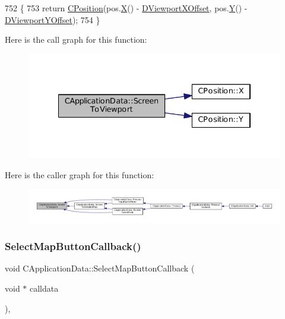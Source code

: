 \begin{DoxyCode}
752                                                                 \{
753     \textcolor{keywordflow}{return} \hyperlink{classCPosition}{CPosition}(pos.\hyperlink{classCPosition_a9a6b94d3b91df1492d166d9964c865fc}{X}() - \hyperlink{classCApplicationData_a306bba873ccc47126111305fe21ef3ff}{DViewportXOffset}, pos.\hyperlink{classCPosition_a1aa8a30e2f08dda1f797736ba8c13a87}{Y}() - 
      \hyperlink{classCApplicationData_afc58ed96a1af813b28f6abf2c7d2dc72}{DViewportYOffset});
754 \}
\end{DoxyCode}
Here is the call graph for this function\+:\nopagebreak
\begin{figure}[H]
\begin{center}
\leavevmode
\includegraphics[width=334pt]{classCApplicationData_aebd3ae4cfd74962413024f1649233f08_cgraph}
\end{center}
\end{figure}
Here is the caller graph for this function\+:\nopagebreak
\begin{figure}[H]
\begin{center}
\leavevmode
\includegraphics[width=350pt]{classCApplicationData_aebd3ae4cfd74962413024f1649233f08_icgraph}
\end{center}
\end{figure}
\hypertarget{classCApplicationData_a5f915dc03205b67ca79f4dcfd7b43f5a}{}\label{classCApplicationData_a5f915dc03205b67ca79f4dcfd7b43f5a} 
\subsubsection{\texorpdfstring{Select\+Map\+Button\+Callback()}{SelectMapButtonCallback()}}
{\footnotesize\ttfamily void C\+Application\+Data\+::\+Select\+Map\+Button\+Callback (\begin{DoxyParamCaption}\item[{void $\ast$}]{calldata }\end{DoxyParamCaption})\hspace{0.3cm}{\ttfamily [static]}, {\ttfamily [protected]}}



